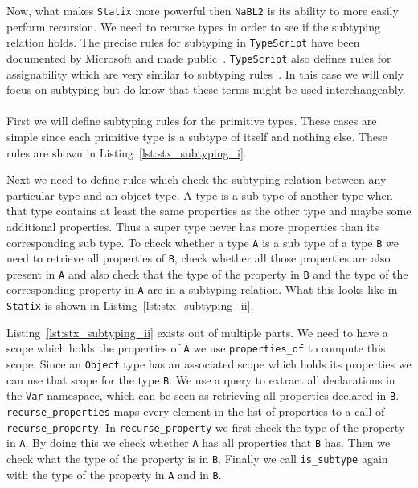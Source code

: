 \documentclass{article}
\newcommand{\ttt}[1]{\texttt{#1}}
\begin{document}
\pagebreak
Now, what makes \ttt{Statix} more powerful then \ttt{NaBL2} is its ability to more easily perform recursion.
We need to recurse types in order to see if the subtyping relation holds.
The precise rules for subtyping in \ttt{TypeScript} have been documented by Microsoft and made public~\cite{TypeScriptSpec}.
\ttt{TypeScript} also defines rules for assignability which are very similar to subtyping rules~\cite{TypeScriptAssignment}.
In this case we will only focus on subtyping but do know that these terms might be used interchangeably.
\\\\
First we will define subtyping rules for the primitive types.
These cases are simple since each primitive type is a subtype of itself and nothing else.
These rules are shown in Listing~\ref{lst:stx_subtyping_i}.
\noindent
\begin{center}
    \begin{minipage}{.60\textwidth}
    
    \end{minipage}
\end{center}
Next we need to define rules which check the subtyping relation between any particular type and an object type.
A type is a sub type of another type when that type contains at least the same properties as the other type and maybe some additional properties.
Thus a super type never has more properties than its corresponding sub type.
To check whether a type \ttt{A} is a sub type of a type \ttt{B} we need to retrieve all properties of \ttt{B}, check whether all those properties are also present in \ttt{A} and also check that the type of the property in \ttt{B} and the type of the corresponding property in \ttt{A} are in a subtyping relation.
What this looks like in \ttt{Statix} is shown in Listing~\ref{lst:stx_subtyping_ii}.
\noindent
\begin{center}
    \begin{minipage}{.88\textwidth}
    
    \end{minipage}
\end{center}
Listing~\ref{lst:stx_subtyping_ii} exists out of multiple parts.
We need to have a scope which holds the properties of \ttt{A} we use \ttt{properties\_of} to compute this scope.
Since an \ttt{Object} type has an associated scope which holds its properties we can use that scope for the type \ttt{B}.
We use a query to extract all declarations in the \ttt{Var} namespace, which can be seen as retrieving all properties declared in \ttt{B}.
\ttt{recurse\_properties} maps every element in the list of properties to a call of \ttt{recurse\_property}.
In \ttt{recurse\_property} we first check the type of the property in \ttt{A}.
By doing this we check whether \ttt{A} has all properties that \ttt{B} has.
Then we check what the type of the property is in \ttt{B}.
Finally we call \ttt{is\_subtype} again with the type of the property in \ttt{A} and in \ttt{B}.
\end{document}
